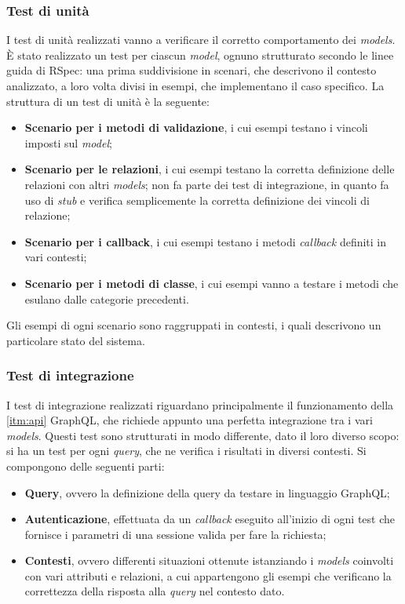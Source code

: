 \subsubsection{Test di unità}
I test di unità realizzati vanno a verificare il corretto comportamento dei \textit{models}. È stato realizzato un test per ciascun \textit{model}, ognuno strutturato secondo le linee guida di RSpec: una prima suddivisione in scenari, che descrivono il contesto analizzato, a loro volta divisi in esempi, che implementano il caso specifico. La struttura di un test di unità è la seguente:
\begin{itemize}
    \item \textbf{Scenario per i metodi di validazione}, i cui esempi testano i vincoli imposti sul \textit{model};
    \item \textbf{Scenario per le relazioni}, i cui esempi testano la corretta definizione delle relazioni con altri \textit{models}; non fa parte dei test di integrazione, in quanto fa uso di \textit{stub} e verifica semplicemente la corretta definizione dei vincoli di relazione;
    \item \textbf{Scenario per i callback}, i cui esempi testano i metodi \textit{callback} definiti in vari contesti;
    \item \textbf{Scenario per i metodi di classe}, i cui esempi vanno a testare i metodi che esulano dalle categorie precedenti.
\end{itemize}

Gli esempi di ogni scenario sono raggruppati in contesti, i quali descrivono un particolare stato del sistema.
\subsubsection{Test di integrazione}
I test di integrazione realizzati riguardano principalmente il funzionamento della \ref{itm:api} GraphQL, che richiede appunto una perfetta integrazione tra i vari \textit{models}. Questi test sono strutturati in modo differente, dato il loro diverso scopo: si ha un test per ogni \textit{query}, che ne verifica i risultati in diversi contesti. Si compongono delle seguenti parti:
\begin{itemize}
    \item \textbf{Query}, ovvero la definizione della query da testare in linguaggio GraphQL;
    \item \textbf{Autenticazione}, effettuata da un \textit{callback} eseguito all'inizio di ogni test che fornisce i parametri di una sessione valida per fare la richiesta;
    \item \textbf{Contesti}, ovvero differenti situazioni ottenute istanziando i \textit{models} coinvolti con vari attributi e relazioni, a cui appartengono gli esempi che verificano la correttezza della risposta alla \textit{query} nel contesto dato.
\end{itemize}

